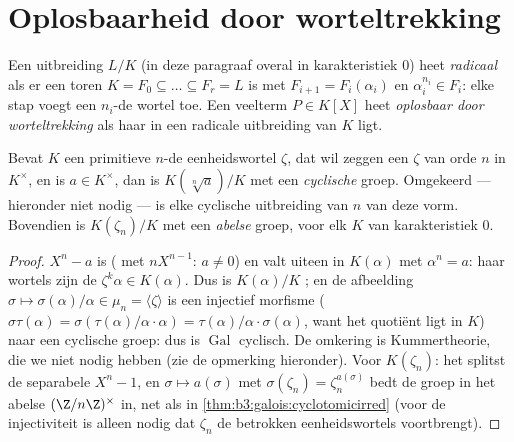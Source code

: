 \section{Oplosbaarheid door worteltrekking}

\begin{definition}\label{def:b3:galois:radical}
Een uitbreiding $L/K$ (in deze paragraaf overal in karakteristiek
$0$) heet \emph{radicaal} als er een toren $K = F_0 \subseteq
\dots \subseteq F_r = L$ is met $F_{i+1} = F_i(\alpha_i)$ en
$\alpha_i^{n_i} \in F_i$: elke stap voegt een $n_i$-de wortel toe.
Een veelterm $P \in K[X]$ heet \emph{oplosbaar door
worteltrekking} als haar
 in een radicale uitbreiding van $K$ ligt.
\end{definition}

\begin{lemma}\label{lem:b3:galois:cyclicsteps}
Bevat $K$ een primitieve $n$-de eenheidswortel $\zeta$, dat wil
zeggen een $\zeta$ van orde $n$ in $K^\times$, en is $a \in
K^\times$, dan is $K(\sqrt[n]a)/K$  met een \emph{cyclische}
groep. Omgekeerd --- hieronder niet nodig --- is elke cyclische
uitbreiding van  $n$ van deze vorm. Bovendien is
$K(\zeta_n)/K$  met een \emph{abelse} groep, voor elk $K$
van karakteristiek $0$.
\end{lemma}

\begin{proof}
$X^n - a$ is  ( met $nX^{n-1}$: $a
\neq 0$) en valt uiteen in $K(\alpha)$ met $\alpha^n = a$: haar
wortels zijn de $\zeta^k\alpha \in K(\alpha)$. Dus is
$K(\alpha)/K$ ; en de afbeelding $\sigma \mapsto
\sigma(\alpha)/\alpha \in \mu_n = \langle \zeta\rangle$ is een
injectief morfisme ($\sigma\tau(\alpha) = \sigma(\tau(\alpha)/
\alpha \cdot \alpha) = \tau(\alpha)/\alpha\cdot\sigma(\alpha)$,
want het quotiënt ligt in $K$) naar een cyclische groep: dus is
$\operatorname{Gal}$ cyclisch. De omkering is Kummertheorie, die
we niet nodig hebben (zie de opmerking hieronder). Voor
$K(\zeta_n)$: het splitst de separabele $X^n - 1$, en $\sigma
\mapsto a(\sigma)$ met $\sigma(\zeta_n) = \zeta_n^{a(\sigma)}$
bedt de groep in het abelse $(\Z/n\Z)^\times$ in, net als in
\cref{thm:b3:galois:cyclotomicirred} (voor de injectiviteit is
alleen nodig dat $\zeta_n$ de betrokken eenheidswortels
voortbrengt).
\end{proof}


